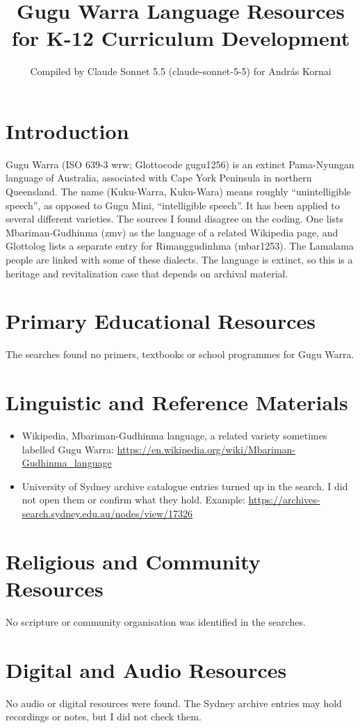 \documentclass[12pt]{article}
\title{Gugu Warra Language Resources for K-12 Curriculum Development}
\author{Compiled by Claude Sonnet 5.5 (claude-sonnet-5-5) for Andr\'as Kornai}
\date{}
\begin{document}
\maketitle

\section{Introduction}
Gugu Warra (ISO 639-3 wrw; Glottocode gugu1256) is an extinct Pama-Nyungan language of Australia, associated with Cape York Peninsula in northern Queensland. The name (Kuku-Warra, Kuku-Wara) means roughly ``unintelligible speech'', as opposed to Gugu Mini, ``intelligible speech''. It has been applied to several different varieties. The sources I found disagree on the coding. One lists Mbariman-Gudhinma (zmv) as the language of a related Wikipedia page, and Glottolog lists a separate entry for Rimanggudinhma (mbar1253). The Lamalama people are linked with some of these dialects. The language is extinct, so this is a heritage and revitalization case that depends on archival material.

\section{Primary Educational Resources}
The searches found no primers, textbooks or school programmes for Gugu Warra.

\section{Linguistic and Reference Materials}
\begin{itemize}
\item Wikipedia, Mbariman-Gudhinma language, a related variety sometimes labelled Gugu Warra: \url{https://en.wikipedia.org/wiki/Mbariman-Gudhinma_language}
\item University of Sydney archive catalogue entries turned up in the search. I did not open them or confirm what they hold. Example: \url{https://archives-search.sydney.edu.au/nodes/view/17326}
\end{itemize}

\section{Religious and Community Resources}
No scripture or community organisation was identified in the searches.

\section{Digital and Audio Resources}
No audio or digital resources were found. The Sydney archive entries may hold recordings or notes, but I did not check them.
\end{document}
